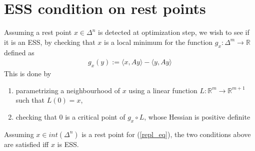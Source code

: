 \documentclass[12pt,a4paper,twoside]{article}
\theoremstyle{plain}
\theoremstyle{definition}
\theoremstyle{remark}
\begin{document}
\section*{ESS condition on rest points}
Assuming a rest point $x \in \Delta^n$ is detected at optimization step, we wish to see if it is an ESS, by checking that $x$ is a local minimum for the function $g_x:\Delta^m \rightarrow \mathbb{R}$ defined as
\begin{align*}
g_x(y) :=  \langle x, A y \rangle  - \langle y, A y \rangle
\end{align*} 
This is done by
\begin{enumerate}[1)]
\item  parametrizing a neighbourhood of $x$ using a linear function $L:\mathbb{R}^m \rightarrow \mathbb{R}^{m+1}$ such that $L(0) = x$, \label{cond_zero_grad}
\item checking that 0 is a critical point of $g_x \circ L$, whose Hessian is positive definite \label{cond_pos_hess}
\end{enumerate}
Assuming $x\in int(\Delta^n)$ is a rest point for (\ref{repl_eq}), the two conditions above are satisfied iff $x$ is ESS.
\end{document}
